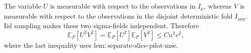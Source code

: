 The variable \(U\) is measurable with respect to the observations in \(I_\mu\), whereas \(V\) is measurable with respect to the observations in the disjoint deterministic fold \(I_{\mathrm{aux}}\). Iid sampling makes these two sigma-fields independent. Therefore
\[
\mathbb E_P[U^2V^2]=\mathbb E_P[U^2]\mathbb E_P[V^2]\le Cu^2v^2,
\]
where the last inequality uses \(\mathrm{lem:separate\text{-}slice\text{-}pilot\text{-}mse}\).